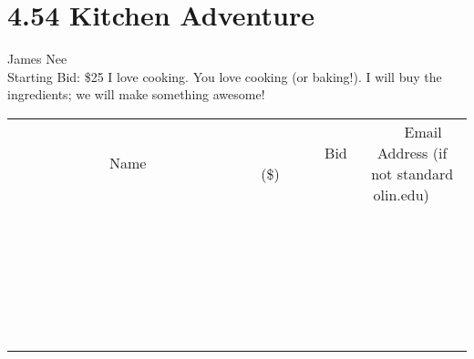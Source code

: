 \documentclass[11pt]{article}
\begin{document}
\section*{4.54 Kitchen Adventure}
James Nee
\\
Starting Bid: \$25
\newline
I love cooking. You love cooking (or baking!). I will buy the ingredients; we will make something awesome!
\\[6ex]
\begin{tabular}{c c c}
~~~~~~~~~~~~~Name~~~~~~~~~~~~~ & ~~~~~~~~~Bid (\$)~~~~~~~~~  & ~~~Email Address (if not standard olin.edu)~~~\\
 & & \\
\hline
 & & \\
\hline
 & & \\
\hline
 & & \\
\hline
 & & \\
\hline
 & & \\
\hline
 & & \\
\hline
 & & \\
\hline
 & & \\
\hline
 & & \\
\hline
 & & \\
\hline
 & & \\
\hline
 & & \\
\hline
 & & \\
\hline
 & & \\
\hline
 & & \\
\hline
 & & \\
\hline
 & & \\
\hline
 & & \\
\hline
 & & \\
\hline
 & & \\
\hline
 & & \\
\hline
 & & \\
\hline
 & & \\
\hline
 & & \\
\hline
 & & \\
\hline
\end{tabular}
\newpage
\end{document}
